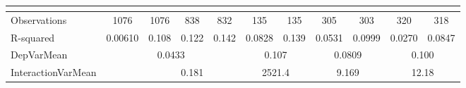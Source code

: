 \begin{tabular}{rrrrrrrrrrr}
\multicolumn{1}{l}{} & \multicolumn{1}{l}{} & \multicolumn{1}{l}{} & \multicolumn{1}{l}{} & \multicolumn{1}{l}{} & \multicolumn{1}{l}{} & \multicolumn{1}{l}{} & \multicolumn{1}{l}{} & \multicolumn{1}{l}{} & \multicolumn{1}{l}{} & \multicolumn{1}{l}{} \\
\midrule
\multicolumn{1}{l}{Observations} & \multicolumn{1}{c}{1076} & \multicolumn{1}{c}{1076} & \multicolumn{1}{c}{838} & \multicolumn{1}{c}{832} & \multicolumn{1}{c}{135} & \multicolumn{1}{c}{135} & \multicolumn{1}{c}{305} & \multicolumn{1}{c}{303} & \multicolumn{1}{c}{320} & \multicolumn{1}{c}{318} \\
\multicolumn{1}{l}{R-squared} & \multicolumn{1}{c}{0.00610} & \multicolumn{1}{c}{0.108} & \multicolumn{1}{c}{0.122} & \multicolumn{1}{c}{0.142} & \multicolumn{1}{c}{0.0828} & \multicolumn{1}{c}{0.139} & \multicolumn{1}{c}{0.0531} & \multicolumn{1}{c}{0.0999} & \multicolumn{1}{c}{0.0270} & \multicolumn{1}{c}{0.0847} \\
\multicolumn{1}{l}{DepVarMean} & \multicolumn{4}{c}{0.0433}    & \multicolumn{2}{c}{0.107} & \multicolumn{2}{c}{0.0809} & \multicolumn{2}{c}{0.100} \\
\multicolumn{1}{l}{InteractionVarMean} & \multicolumn{1}{c}{} & \multicolumn{3}{c}{0.181} & \multicolumn{2}{c}{2521.4} & \multicolumn{2}{c}{9.169} & \multicolumn{2}{c}{12.18} \\
\bottomrule
\end{tabular}%
